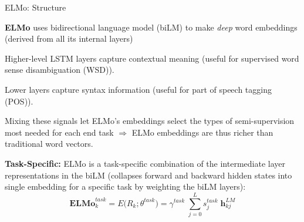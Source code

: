\begin{frame}{ELMo: Structure}

    \begin{itemizeSpaced}{2pt}
        \item \textbf{ELMo} uses bidirectional language model (biLM) to make \emph{deep} word embeddings (derived from all its internal layers)

        \item Higher-level LSTM layers capture contextual meaning (useful for supervised word sense disambiguation (WSD)).
        
        \item Lower layers capture syntax information (useful for part of speech tagging (POS)). 
        
        \item Mixing these signals let ELMo's embeddings select the types of semi-supervision most needed for each end task $\Rightarrow$ ELMo embeddings are thus richer than traditional word vectors. 
        
        \item \textbf{Task-Specific: } ELMo is a task-specific combination of the intermediate layer representations in the biLM (collapses forward and backward hidden states into single embedding for a specific task by weighting the biLM layers): \footnotemark 
        $$
        \textbf{ELMo}_k^{task} = E \Big( R_k; \theta^{task} \Big) = \gamma^{task} \; \sum_{j=0}^L s_j^{task} \; \mathbf{h}_{kj}^{LM}
        $$ 
        
        
    \end{itemizeSpaced}
    
    
    
\end{frame}



